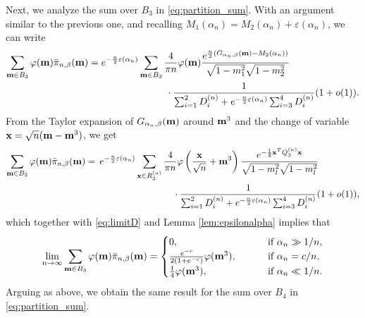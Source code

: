 \documentclass[11pt,oneside]{amsart}
\numberwithin{equation}{section}  %
\theoremstyle{plain}
\theoremstyle{remark}
\def \bm {{\bf m}}
\begin{document}
Next, we analyze the sum over $B_3$ in \eqref{eq:partition_sum}. With an argument similar to the previous one, and recalling $M_1(\alpha_n)=M_2(\alpha_n)+\varepsilon(\alpha_n)$, 
we can write
\begin{align*}
     \sum_{\bm \in B_3}  \varphi(\bm) \bar{\pi}_{n,\beta}(\bm)
     &= e^{-\frac{n}{2} \varepsilon(\alpha_n)}\sum_{\bm \in B_3} \frac{4}{\pi n } \varphi(\bm) 
     \frac{e^{ \frac{n}{2} (G_{\alpha_n,\beta}(\bm)-M_2(\alpha_n))}}{ \sqrt{1-m_1^2}\sqrt{1-m_2^2}}\\
     &\qquad \qquad \qquad \qquad \cdot 
    \frac{1}{ \sum_{i=1}^2 D_i^{(n)}+e^{-\frac{n}{2} \varepsilon(\alpha_n)} \sum_{i=3}^4 D_i^{(n)} } (1+o(1)).
\end{align*}
From the Taylor expansion of $G_{\alpha_n,\beta}(\bm)$ around $\bm^3$ and the change of variable ${\bf x}=\sqrt{n} (\bm-\bm^3)$, we get
\begin{align*}
    \sum_{\bm \in B_3} \varphi(\bm) \bar{\pi}_{n,\beta}(\bm)
    =\, e^{-\frac{n}{2} \varepsilon(\alpha_n)} 
    &\sum_{\textbf{x} \in R_3^{(n)} } \frac{4}{\pi n }  \varphi \left(\frac{{\bf x}}{\sqrt{n}}+\bm^3 \right) 
   \frac{e^{-\frac{1}{2}{\bf x}^TQ_3^{(n)}{\bf x}}}{\sqrt{1- m_l^2} \sqrt{1- m_l^2}} 
    \\
    & \qquad \qquad\cdot\frac{1}{\sum_{i=1}^2 D_i^{(n)}+e^{-\frac{n}{2} \varepsilon(\alpha_n)} \sum_{i=3}^4 D_i^{(n)}} (1+o(1)),
\end{align*}
%
which together with \eqref{eq:limitD} and Lemma \ref{lem:epsilonalpha} implies that
\begin{align*}
   \lim_{n \to \infty} \sum_{\bm \in B_3} \varphi(\bm) \bar{\pi}_{n,\beta}(\bm)=
         \begin{cases}
          0,  & \qquad \text{ if }  \alpha_n \gg 1/n, \\
        \frac{e^{-c}}{2(1+e^{-c})} \varphi(\bm^3),  & \qquad \text{ if } \alpha_n = c/n,\\
          \frac{1}{4} \varphi(\bm^3),  & \qquad \text{ if }  \alpha_n \ll 1/n.
      \end{cases}
\end{align*}
Arguing as above, we obtain the same result for the sum over $B_4$ in \eqref{eq:partition_sum}.
\end{document}
